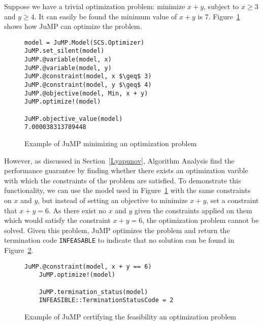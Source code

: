 Suppose we have a trivial optimization problem: minimize $x + y$, subject to $x \geq 3$ and $y \geq 4$. It can easily be found the minimum value of $x + y$ is $7$. Figure~\ref{ex_jump1} shows how JuMP can optimize the problem.

\begin{figure}[ht]
	\begin{lstlisting}[mathescape]
model = JuMP.Model(SCS.Optimizer)
JuMP.set_silent(model)
JuMP.@variable(model, x)
JuMP.@variable(model, y)
JuMP.@constraint(model, x $\geq$ 3)
JuMP.@constraint(model, y $\geq$ 4)
JuMP.@objective(model, Min, x + y)
JuMP.optimize!(model)

JuMP.objective_value(model)
7.000038313789448
	\end{lstlisting}
	\caption{Example of JuMP minimizing an optimization problem}
	\label{ex_jump1}
\end{figure}

However, as discussed in Section~\ref{Lyapunov}, Algorithm Analysis find the performance guarantee by finding whether there exists an optimization varible with which the constraints of the problem are satisfied. To demonstrate this functionality, we can use the model used in Figure~\ref{ex_jump1} with the same constraints on $x$ and $y$, but instead of setting an objective to minimize $x + y$, set a constraint that $x + y = 6$. As there exist no $x$ and $y$ given the constraints applied on them which would satisfy the constraint $x + y = 6$, the optimization problem cannot be solved. Given this problem, JuMP optimizes the problem and return the termination code \texttt{INFEASABLE} to indicate that no solution can be found in Figure~\ref{ex_jump2}.

\begin{figure}[ht]
	\begin{lstlisting}[mathescape]
	JuMP.@constraint(model, x + y == 6)
	JuMP.optimize!(model)
	
	JuMP.termination_status(model)
	INFEASIBLE::TerminationStatusCode = 2
	\end{lstlisting}
	\caption{Example of JuMP certifying the feasibility an optimization problem}
	\label{ex_jump2}
\end{figure}